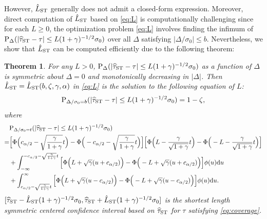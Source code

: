 \documentclass[11pt]{article}
\def\P{{\mathrm P}}
\def\d{{\mathrm d}}
\newcommand{\htau}{\widehat\tau}
\numberwithin{equation}{section}
\newtheorem{theorem}{Theorem}[section]
\theoremstyle{definition}
\begin{document}
However, $\hat{L}_{\rm ST}$ generally does not admit a closed-form expression. Moreover, direct computation of $\hat{L}_{\rm ST}$ based on \eqref{eq:L} is computationally challenging since for each $L \ge 0$, the optimization problem \eqref{eq:L} involves finding the infimum of $\P_\Delta(\lvert \htau_{\rm ST} - \tau \rvert \le L (1+\gamma)^{-1/2} \sigma_0)$ over all $\Delta$ satisfying $\lvert \Delta/\sigma_0 \rvert \le b$. Nevertheless, we show that $\hat{L}_{\rm ST}$ can be computed efficiently due to the following theorem:
\begin{theorem}\label{thm:L_ST}
  For any $L > 0$, $\P_\Delta(\lvert \htau_{\rm ST}- \tau \rvert \le L (1+\gamma)^{-1/2} \sigma_0)$ as a function of $\Delta$ is symmetric about $\Delta = 0$ and monotonically decreasing in $\lvert \Delta \rvert$. Then $\hat{L}_{\rm ST} = \hat{L}_{\rm ST}(b, \zeta, \gamma, \alpha)$ in \eqref{eq:L} is the solution to the following equation of $L$:
  \begin{align*}
    \P_{\Delta/\sigma_0 = b}(\lvert \htau_{\rm ST}- \tau \rvert \le L (1+\gamma)^{-1/2} \sigma_0) = 1-\zeta,
  \end{align*} 
  where
  \begin{align}\label{eq:P_ST}
    &\P_{\Delta/\sigma_0 = t}(\lvert \htau_{\rm ST}- \tau \rvert \le L (1+\gamma)^{-1/2} \sigma_0) \nonumber\\
    =& \Big[\Phi\Big(c_{\alpha/2} - \sqrt{\frac{\gamma}{1+\gamma}}t \Big) - \Phi\Big(-c_{\alpha/2} - \sqrt{\frac{\gamma}{1+\gamma}}t \Big)\Big]\Big[\Phi\Big(L - \frac{\gamma}{\sqrt{1+\gamma}}t \Big) - \Phi\Big(-L - \frac{\gamma}{\sqrt{1+\gamma}}t \Big)\Big]\nonumber\\
    &+ \int_{-\infty}^{-c_{\alpha/2} - \sqrt{\frac{\gamma}{1+\gamma}}t} \Big[\Phi\Big(L + \sqrt{\gamma} (u+c_{\alpha/2})\Big) - \Phi\Big(-L + \sqrt{\gamma} (u+c_{\alpha/2})\Big)\Big] \phi(u) \d u\nonumber\\
    &+ \int_{c_{\alpha/2} - \sqrt{\frac{\gamma}{1+\gamma}}t}^\infty \Big[\Phi\Big(L + \sqrt{\gamma} (u-c_{\alpha/2})\Big) - \Phi\Big(-L + \sqrt{\gamma} (u-c_{\alpha/2})\Big)\Big] \phi(u) \d u.
  \end{align}
  $[\htau_{\rm ST} - \hat{L}_{\rm ST} (1+\gamma)^{-1/2} \sigma_0, \htau_{\rm ST} + \hat{L}_{\rm ST} (1+\gamma)^{-1/2} \sigma_0]$ is the shortest length symmetric centered confidence interval based on $\htau_{\rm ST}$ for $\tau$ satisfying \eqref{eq:coverage}.
\end{theorem}
\end{document}
